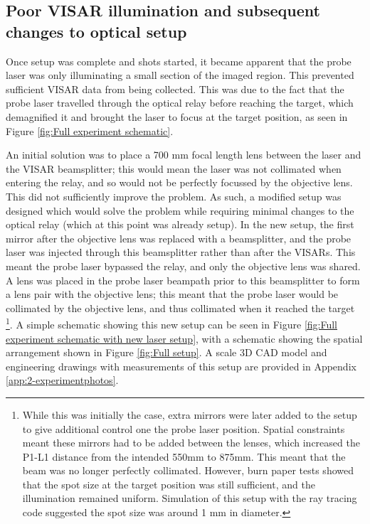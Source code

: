\subsection{Poor VISAR illumination and subsequent changes to optical setup}

Once setup was complete and shots started, it became apparent that the probe laser was only illuminating a small section of the imaged region. This prevented sufficient VISAR data from being collected. This was due to the fact that the probe laser travelled through the optical relay before reaching the target, which demagnified it and brought the laser to focus at the target position, as seen in Figure \ref{fig:Full experiment schematic}. 

An initial solution was to place a 700 \unit{\milli\meter} focal length lens between the laser and the VISAR beamsplitter; this would mean the laser was not collimated when entering the relay, and so would not be perfectly focussed by the objective lens. This did not sufficiently improve the problem. As such, a modified setup was designed which would solve the problem while requiring minimal changes to the optical relay (which at this point was already setup). In the new setup, the first mirror after the objective lens was replaced with a beamsplitter, and the probe laser was injected through this beamsplitter rather than after the VISARs. This meant the probe laser bypassed the relay, and only the objective lens was shared. A lens was placed in the probe laser beampath prior to this beamsplitter to form a lens pair with the objective lens; this meant that the probe laser would be collimated by the objective lens, and thus collimated when it reached the target \footnote{While this was initially the case, extra mirrors were later added to the setup to give additional control one the probe laser position. Spatial constraints meant these mirrors had to be added between the lenses, which increased the P1-L1 distance from the intended 550mm to 875mm. This meant that the beam was no longer perfectly collimated. However, burn paper tests showed that the spot size at the target position was still sufficient, and the illumination remained uniform. Simulation of this setup with the ray tracing code suggested the spot size was around 1 mm in diameter.}. A simple schematic showing this new setup can be seen in Figure \ref{fig:Full experiment schematic with new laser setup}, with a schematic showing the spatial arrangement shown in Figure \ref{fig:Full setup}. A scale 3D CAD model and engineering drawings with measurements of this setup are provided in Appendix \ref{app:2-experimentphotos}.

